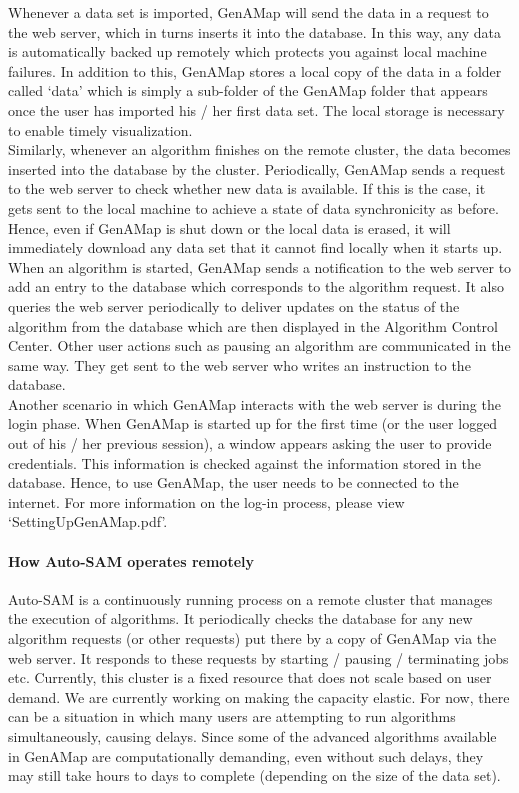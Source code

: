 \documentclass{article}
\begin{document}
Whenever a data set is imported, GenAMap will send the data in a request to the web server, which in turns inserts it into the database. In this way, any data is automatically backed up remotely which protects you against local machine failures. In addition to this, GenAMap stores a local copy of the data in a folder called `data' which is simply a sub-folder of the GenAMap folder that appears once the user has imported his / her first data set. The local storage is necessary to enable timely visualization. \\

Similarly, whenever an algorithm finishes on the remote cluster, the data becomes inserted into the database by the cluster. Periodically, GenAMap sends a request to the web server to check whether new data is available. If this is the case, it gets sent to the local machine to achieve a state of data synchronicity as before. Hence, even if GenAMap is shut down or the local data is erased, it will immediately download any data set that it cannot find locally when it starts up.\\

When an algorithm is started, GenAMap sends a notification to the web server to add an entry to the database which corresponds to the algorithm request. It also queries the web server periodically to deliver updates on the status of the algorithm from the database which are then displayed in the Algorithm Control Center. Other user actions such as pausing an algorithm are communicated in the same way. They get sent to the web server who writes an instruction to the database.\\

Another scenario in which GenAMap interacts with the web server is during the login phase. When GenAMap is started up for the first time (or the user logged out of his / her previous session), a window appears asking the user to provide credentials. This information is checked against the information stored in the database. Hence, to use GenAMap, the user needs to be connected to the internet. For more information on the log-in process, please view `SettingUpGenAMap.pdf'.

\paragraph{How Auto-SAM operates remotely} Auto-SAM is a continuously running process on a remote cluster that manages the execution of algorithms. It periodically checks the database for any new algorithm requests (or other requests) put there by a copy of GenAMap via the web server. It responds to these requests by starting / pausing / terminating jobs etc. Currently, this cluster is a fixed resource that does not scale based on user demand. We are currently working on making the capacity elastic. For now, there can be a situation in which many users are attempting to run algorithms simultaneously, causing delays. Since some of the advanced algorithms available in GenAMap are computationally demanding, even without such delays, they may still take hours to days to complete (depending on the size of the data set). 
\end{document}
